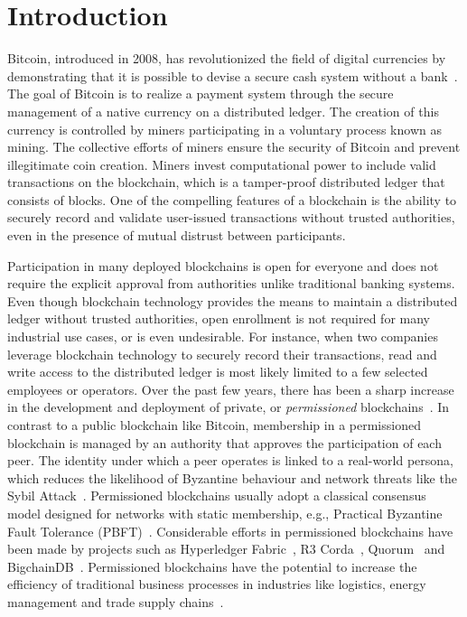\section{Introduction}
Bitcoin, introduced in 2008, has revolutionized the field of digital currencies by demonstrating that it is possible to devise a secure cash system without a bank~\cite{nakamoto2008bitcoin}.
The goal of Bitcoin is to realize a payment system through the secure management of a native currency on a distributed ledger.
The creation of this currency is controlled by miners participating in a voluntary process known as mining.
The collective efforts of miners ensure the security of Bitcoin and prevent illegitimate coin creation.
Miners invest computational power to include valid transactions on the blockchain, which is a tamper-proof distributed ledger that consists of blocks.
One of the compelling features of a blockchain is the ability to securely record and validate user-issued transactions without trusted authorities, even in the presence of mutual distrust between participants.

Participation in many deployed blockchains is open for everyone and does not require the explicit approval from authorities unlike traditional banking systems.
Even though blockchain technology provides the means to maintain a distributed ledger without trusted authorities, open enrollment is not required for many industrial use cases, or is even undesirable.
For instance, when two companies leverage blockchain technology to securely record their transactions, read and write access to the distributed ledger is most likely limited to a few selected employees or operators.
Over the past few years, there has been a sharp increase in the development and deployment of private, or \emph{permissioned} blockchains~\cite{androulaki2018hyperledger,de2018pbft,vukolic2017rethinking}.
In contrast to a public blockchain like Bitcoin, membership in a permissioned blockchain is managed by an authority that approves the participation of each peer.
The identity under which a peer operates is linked to a real-world persona, which reduces the likelihood of Byzantine behaviour and network threats like the Sybil Attack~\cite{douceur2002sybil}.
Permissioned blockchains usually adopt a classical consensus model designed for networks with static membership, e.g., Practical Byzantine Fault Tolerance (PBFT)~\cite{castro1999practical}.
Considerable efforts in permissioned blockchains have been made by projects such as Hyperledger Fabric~\cite{androulaki2018hyperledger}, R3 Corda~\cite{r3corda}, Quorum~\cite{mogan2018quorum} and BigchainDB~\cite{mcconaghy2016bigchaindb}.
Permissioned blockchains have the potential to increase the efficiency of traditional business processes in industries like logistics, energy management and trade supply chains~\cite{vukolic2017rethinking}.

